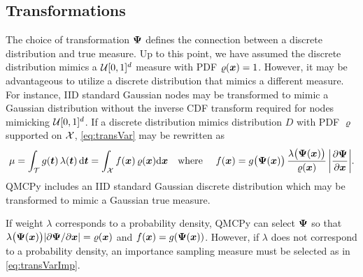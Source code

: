 \documentclass[graybox,footinfo]{svmult}
\newcommand{\QMCPYabs}[1]{\ensuremath{{\left \lvert #1 \right \rvert}}}
\begin{document}
\subsection{Transformations}

The choice of transformation ${\boldsymbol{\Psi}}$ defines the connection between a discrete distribution and true measure. Up to this point, we have assumed the discrete distribution mimics a ${\mathcal{U}}[0,1]^d$ measure with PDF $\varrho({\boldsymbol{x}})=1$. However, it may be advantageous to utilize a discrete distribution that mimics a different measure. For instance, IID standard Gaussian nodes may be transformed to mimic a Gaussian distribution without the inverse CDF transform required for nodes mimicking ${\mathcal{U}}[0,1]^d$. If a discrete distribution mimics distribution $D$ with PDF $\varrho$ supported on ${\mathcal{X}}$, \eqref{eq:transVar} may be rewritten as
\begin{equation*}
 \mu = \int_\calT g(\bst) \, \lambda(\bst) \, \D \bst  =  \int_{\calX}f(\bsx) \, \varrho(\bsx) \D \bsx  \quad \text{where } \quad f(\bsx)  = g\bigl(\bsPsi(\bsx)\bigr)  \, \frac{\lambda\bigl(\bsPsi(\bsx)\bigr)}{\varrho(\bsx)} \,\QMCPYabs{\frac{\partial \bsPsi}{\partial \bsx}}.
\end{equation*}
QMCPy includes an IID standard Gaussian discrete distribution which may be transformed to mimic a Gaussian true measure.

If weight $\lambda$ corresponds to a probability density, QMCPy can select ${\boldsymbol{\Psi}}$ so that $\lambda\bigl({\boldsymbol{\Psi}}({\boldsymbol{x}})\bigr) \lvert \partial {\boldsymbol{\Psi}}/ \partial {\boldsymbol{x}}\rvert = \varrho({\boldsymbol{x}})$ and $f({\boldsymbol{x}})=g({\boldsymbol{\Psi}}({\boldsymbol{x}}))$. However, if $\lambda$ does not correspond to a probability density, an importance sampling measure must be selected as in \eqref{eq:transVarImp}.
\end{document}
